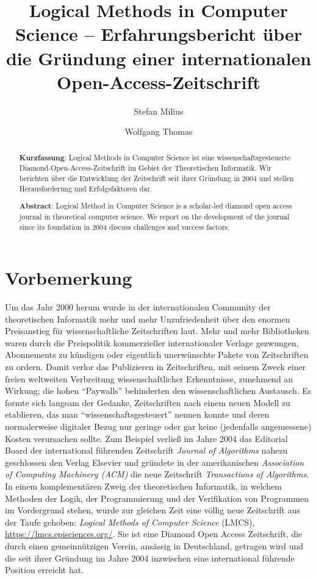 \documentclass[a4paper,
fontsize=11pt,
oneside,
numbers=noperiodatend,
parskip=half-,
bibliography=totoc,
final
]{scrartcl}
\title{\LARGE{Logical Methods in Computer Science -- Erfahrungsbericht über die Gründung einer internationalen Open-Access-Zeitschrift}}%
\author{Stefan Milius \and Wolfgang Thomas} %
\date{}
\begin{document}
\maketitle
\thispagestyle{fancyplain} 

\begin{abstract}
\noindent
\textbf{Kurzfassung}: Logical Methods in Computer Science ist eine
wissenschaftsgesteuerte Diamond-Open-Access-Zeitschrift im Gebiet der
Theoretischen Informatik. Wir berichten über die Entwicklung der
Zeitschrift seit ihrer Gründung in 2004 und stellen Herausforderung und
Erfolgsfaktoren dar.

\noindent\textbf{Abstract}: Logical Method in Computer Science is a scholar-led
diamond open access journal in theoretical computer science. We report
on the development of the journal since its foundation in 2004 discuss
challenges and success factors.
\end{abstract}

\hypertarget{vorbemerkung}{%
\section{Vorbemerkung}\label{vorbemerkung}}

Um das Jahr 2000 herum wurde in der internationalen Community der
theoretischen Informatik mehr und mehr Unzufriedenheit über den enormen
Preisanstieg für wissenschaftliche Zeitschriften laut. Mehr und mehr
Bibliotheken waren durch die Preispolitik kommerzieller internationaler
Verlage gezwungen, Abonnements zu kündigen oder eigentlich unerwünschte
Pakete von Zeitschriften zu ordern. Damit verlor das Publizieren in
Zeitschriften, mit seinem Zweck einer freien weltweiten Verbreitung
wissenschaftlicher Erkenntnisse, zunehmend an Wirkung; die hohen
\enquote{Paywalls} behinderten den wissenschaftlichen Austausch. Es
formte sich langsam der Gedanke, Zeitschriften nach einem neuen Modell
zu etablieren, das man \enquote{wissenschaftsgesteuert} nennen konnte
und deren normalerweise digitaler Bezug nur geringe oder gar keine
(jedenfalls angemessene) Kosten verursachen sollte. Zum Beispiel verließ
im Jahre 2004 das Editorial Board der international führenden
Zeitschrift \emph{Journal of Algorithms} nahezu geschlossen den Verlag
Elsevier und gründete in der amerikanischen \emph{Association of
Computing Machinery (ACM)} die neue Zeitschrift \emph{Transactions of
Algorithms}. In einem komplementären Zweig der theoretischen Informatik,
in welchem Methoden der Logik, der Programmierung und der Verifikation
von Programmen im Vordergrund stehen, wurde zur gleichen Zeit eine
völlig neue Zeitschrift aus der Taufe gehoben: \emph{Logical Methods of
Computer Science} (LMCS), \url{https://lmcs.episciences.org/}. Sie ist
eine Diamond Open Access Zeitschrift, die durch einen gemeinnützigen
Verein, ansässig in Deutschland, getragen wird und die seit ihrer
Gründung im Jahre 2004 inzwischen eine international führende Position
erreicht hat.
\end{document}
